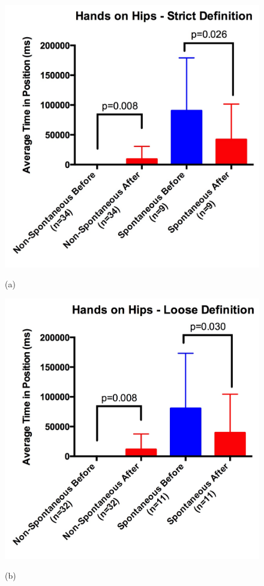 \documentclass{acm_proc_article-sp}
\begin{document}
\begin{figure}[t!]
\centering
 \includegraphics[width=0.65\linewidth]{images/hstrict.jpg}\\
 \caption{(a)} 
 \label{hstrict} %
\end{figure}

\begin{figure}[t!]
\centering
 \includegraphics[width=0.65\linewidth]{images/hloose.jpg}\\
 \caption{(b)}
 \label{hloose} %
\end{figure}
\end{document}
